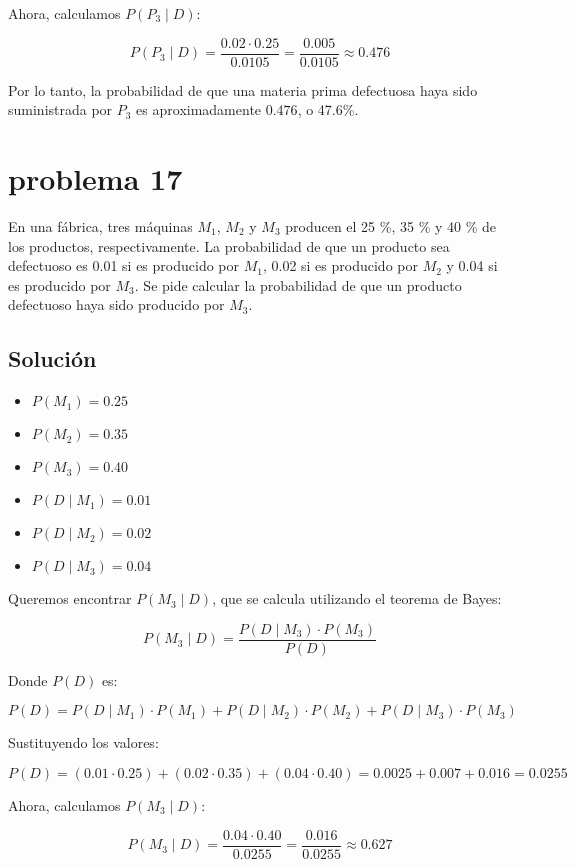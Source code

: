 \documentclass[12pt,a4paper]{article}
\begin{document}
Ahora, calculamos \( P(P_3 \mid D) \):

\[
P(P_3 \mid D) = \frac{0.02 \cdot 0.25}{0.0105} = \frac{0.005}{0.0105} \approx 0.476
\]

Por lo tanto, la probabilidad de que una materia prima defectuosa haya sido suministrada por \( P_3 \) es aproximadamente \( 0.476 \), o 47.6\%.

\newpage 
\section*{problema 17}
En una fábrica, tres máquinas \( M_1 \), \( M_2 \) y \( M_3 \) producen el 25 \%, 35 \% y 40 \% de los productos, respectivamente. La probabilidad de que un producto sea defectuoso es 0.01 si es producido por \( M_1 \), 0.02 si es producido por \( M_2 \) y 0.04 si es producido por \( M_3 \). Se pide calcular la probabilidad de que un producto defectuoso haya sido producido por \( M_3 \).

\subsection*{Solución}

\begin{itemize}
    \item \( P(M_1) = 0.25 \)
    \item \( P(M_2) = 0.35 \)
    \item \( P(M_3) = 0.40 \)
    \item \( P(D \mid M_1) = 0.01 \)
    \item \( P(D \mid M_2) = 0.02 \)
    \item \( P(D \mid M_3) = 0.04 \)
\end{itemize}

Queremos encontrar \( P(M_3 \mid D) \), que se calcula utilizando el teorema de Bayes:

\[
P(M_3 \mid D) = \frac{P(D \mid M_3) \cdot P(M_3)}{P(D)}
\]

Donde \( P(D) \) es:

\[
P(D) = P(D \mid M_1) \cdot P(M_1) + P(D \mid M_2) \cdot P(M_2) + P(D \mid M_3) \cdot P(M_3)
\]

Sustituyendo los valores:

\[
P(D) = (0.01 \cdot 0.25) + (0.02 \cdot 0.35) + (0.04 \cdot 0.40) = 0.0025 + 0.007 + 0.016 = 0.0255
\]

Ahora, calculamos \( P(M_3 \mid D) \):

\[
P(M_3 \mid D) = \frac{0.04 \cdot 0.40}{0.0255} = \frac{0.016}{0.0255} \approx 0.627
\]
\end{document}
